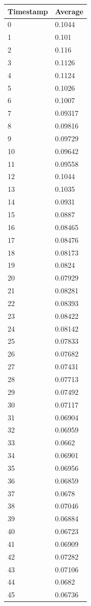 %
%
\begin{tabular}{|l||l|}
\hline
	\textbf{Timestamp} & \textbf{Average} \\ \hline
	0 & 0.1044 \\ \hline
	1 & 0.101 \\ \hline
	2 & 0.116 \\ \hline
	3 & 0.1126 \\ \hline
	4 & 0.1124 \\ \hline
	5 & 0.1026 \\ \hline
	6 & 0.1007 \\ \hline
	7 & 0.09317 \\ \hline
	8 & 0.09816 \\ \hline
	9 & 0.09729 \\ \hline
	10 & 0.09642 \\ \hline
	11 & 0.09558 \\ \hline
	12 & 0.1044 \\ \hline
	13 & 0.1035 \\ \hline
	14 & 0.0931 \\ \hline
	15 & 0.0887 \\ \hline
	16 & 0.08465 \\ \hline
	17 & 0.08476 \\ \hline
	18 & 0.08173 \\ \hline
	19 & 0.0824 \\ \hline
	20 & 0.07929 \\ \hline
	21 & 0.08281 \\ \hline
	22 & 0.08393 \\ \hline
	23 & 0.08422 \\ \hline
	24 & 0.08142 \\ \hline
	25 & 0.07833 \\ \hline
	26 & 0.07682 \\ \hline
	27 & 0.07431 \\ \hline
	28 & 0.07713 \\ \hline
	29 & 0.07492 \\ \hline
	30 & 0.07117 \\ \hline
	31 & 0.06904 \\ \hline
	32 & 0.06959 \\ \hline
	33 & 0.0662 \\ \hline
	34 & 0.06901 \\ \hline
	35 & 0.06956 \\ \hline
	36 & 0.06859 \\ \hline
	37 & 0.0678 \\ \hline
	38 & 0.07046 \\ \hline
	39 & 0.06884 \\ \hline
	40 & 0.06723 \\ \hline
	41 & 0.06909 \\ \hline
	42 & 0.07282 \\ \hline
	43 & 0.07106 \\ \hline
	44 & 0.0682 \\ \hline
	45 & 0.06736 \\ \hline
\end{tabular}
